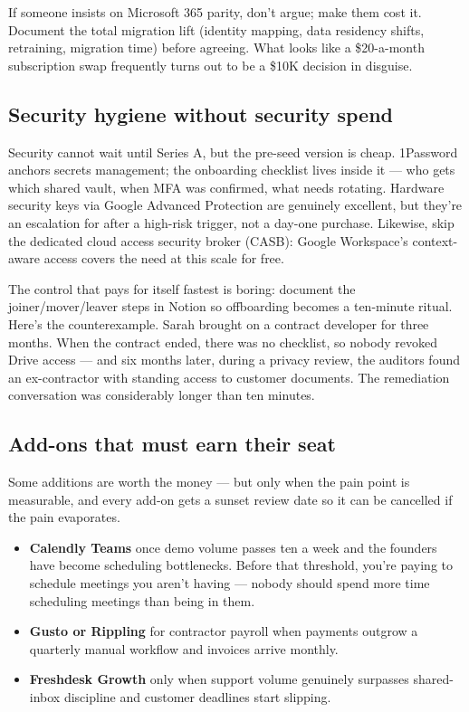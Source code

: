 If someone insists on Microsoft 365 parity, don't argue; make them cost it. Document the total migration lift (identity mapping, data residency shifts, retraining, migration time) before agreeing. What looks like a \$20-a-month subscription swap frequently turns out to be a \$10K decision in disguise.



\subsection{Security hygiene without security spend}


Security cannot wait until Series A, but the pre-seed version is cheap. 1Password anchors secrets management; the onboarding checklist lives inside it — who gets which shared vault, when MFA was confirmed, what needs rotating. Hardware security keys via Google Advanced Protection are genuinely excellent, but they're an escalation for after a high-risk trigger, not a day-one purchase. Likewise, skip the dedicated cloud access security broker (CASB): Google Workspace's context-aware access covers the need at this scale for free.


The control that pays for itself fastest is boring: document the joiner/mover/leaver steps in Notion so offboarding becomes a ten-minute ritual. Here's the counterexample. Sarah brought on a contract developer for three months. When the contract ended, there was no checklist, so nobody revoked Drive access — and six months later, during a privacy review, the auditors found an ex-contractor with standing access to customer documents. The remediation conversation was considerably longer than ten minutes.



\subsection{Add-ons that must earn their seat}


Some additions are worth the money — but only when the pain point is measurable, and every add-on gets a sunset review date so it can be cancelled if the pain evaporates.


\begin{itemize}[leftmargin=*]
\item \textbf{Calendly Teams} once demo volume passes ten a week and the founders have become scheduling bottlenecks. Before that threshold, you're paying to schedule meetings you aren't having — nobody should spend more time scheduling meetings than being in them.
\item \textbf{Gusto or Rippling} for contractor payroll when payments outgrow a quarterly manual workflow and invoices arrive monthly.
\item \textbf{Freshdesk Growth} only when support volume genuinely surpasses shared-inbox discipline and customer deadlines start slipping.
\end{itemize}

